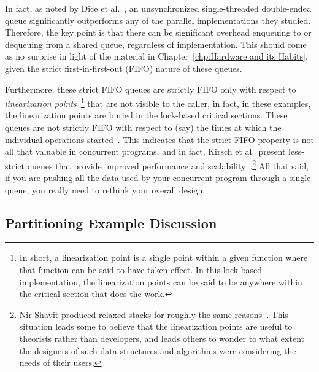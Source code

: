 \QuickQuizEnd

In fact, as noted by Dice et al.~\cite{DavidDice:2010:SCA:HTM:deque},
an unsynchronized single-threaded double-ended queue significantly
outperforms any of the parallel implementations they studied.
Therefore, the key point is that there can be significant overhead enqueuing to
or dequeuing from a shared queue, regardless of implementation.
This should come as no surprise in light of the material in
Chapter~\ref{chp:Hardware and its Habits}, given the strict
first-in-first-out (FIFO) nature of these queues.

Furthermore, these strict FIFO queues are strictly FIFO only with
respect to
\emph{linearization points}~\cite{Herlihy:1990:LCC:78969.78972}\footnote{
	In short, a linearization point is a single point within a given
	function where that function can be said to have taken effect.
	In this lock-based implementation, the linearization points
	can be said to be anywhere within the critical section that
	does the work.}
that are not visible to the caller, in fact, in these examples,
the linearization points are buried in the lock-based critical
sections.
These queues are not strictly FIFO with respect to (say) the times at which
the individual operations started~\cite{AndreasHaas2012FIFOisnt}.
This indicates that the strict FIFO property is not all that valuable
in concurrent programs, and in fact, Kirsch et al.~present less-strict
queues that provide improved performance and
scalability~\cite{ChristophMKirsch2012FIFOisntTR}.\footnote{
	Nir Shavit produced relaxed stacks for roughly the same
	reasons~\cite{Shavit:2011:DSM:1897852.1897873}.
	This situation leads some to believe that the linearization
	points are useful to theorists rather than developers, and
	leads others to wonder to what extent the designers of such
	data structures and algorithms were considering the needs
	of their users.}
All that said, if you are pushing all the data used by your concurrent
program through a single queue, you really need to rethink your
overall design.

\subsection{Partitioning Example Discussion}
\label{sec:SMPdesign:Partitioning Example Discussion}

